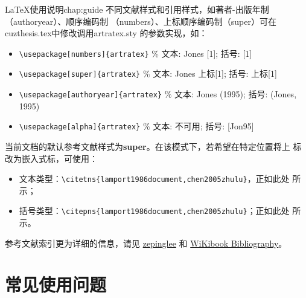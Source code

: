 \begin{cuzchapter}{\LaTeX{}使用说明}{chap:guide}
	不同文献样式和引用样式，如著者-出版年制（authoryear）、顺序编码制
	（numbers）、上标顺序编码制（super）可在cuzthesis.tex中修改调用artratex.sty
	的参数实现，如：
	\begin{itemize}
		\item \verb+\usepackage[numbers]{artratex}+ $\%$ 文本: Jones [1]; 括号: [1]
		\item \verb+\usepackage[super]{artratex}+ $\%$ 文本: Jones 上标[1]; 括号: 上标[1]
		\item \verb+\usepackage[authoryear]{artratex}+ $\%$ 文本: Jones (1995); 括号: (Jones, 1995)
		\item \verb+\usepackage[alpha]{artratex}+ $\%$ 文本: 不可用; 括号: [Jon95]
	\end{itemize}

	当前文档的默认参考文献样式为\textbf{super}。在该模式下，若希望在特定位置将上
	标改为嵌入式标，可使用：

	\begin{itemize}
		\item 文本类型：\verb|\citetns{lamport1986document,chen2005zhulu}|，正如此处
		      所示；
		\item 括号类型：\verb|\citepns{lamport1986document,chen2005zhulu}|；正如此处
		      所示。
	\end{itemize}

	参考文献索引更为详细的信息，请见
	\href{https://github.com/zepinglee/gbt7714-bibtex-style}{zepinglee} 和
	\href{https://en.wikibooks.org/wiki/LaTeX/Bibliography_Management}{WiKibook
		Bibliography}。


	\section{常见使用问题}\label{sec:qa}


\end{cuzchapter}
